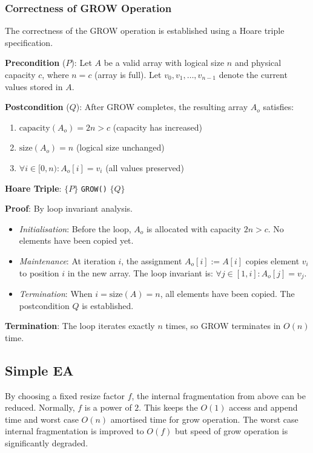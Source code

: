 \subsubsection{Correctness of GROW Operation}

The correctness of the GROW operation is established using a Hoare triple specification.

\textbf{Precondition} ($P$): Let $A$ be a valid array with logical size $n$ and physical capacity $c$, where $n = c$ (array is full). Let $v_0, v_1, \ldots, v_{n-1}$ denote the current values stored in $A$.

\textbf{Postcondition} ($Q$): After GROW completes, the resulting array $A_o$ satisfies:
\begin{enumerate}
    \item $\text{capacity}(A_o) = 2n > c$ (capacity has increased)
    \item $\text{size}(A_o) = n$ (logical size unchanged)
    \item $\forall i \in [0, n): A_o[i] = v_i$ (all values preserved)
\end{enumerate}

\textbf{Hoare Triple}: $\{P\}$ \texttt{GROW()} $\{Q\}$

\textbf{Proof}: By loop invariant analysis.
\begin{itemize}
    \item \textit{Initialisation}: Before the loop, $A_o$ is allocated with capacity $2n > c$. No elements have been copied yet.
    \item \textit{Maintenance}: At iteration $i$, the assignment $A_o[i] := A[i]$ copies element $v_i$ to position $i$ in the new array. The loop invariant is: $\forall j \in [1, i]: A_o[j] = v_j$.
    \item \textit{Termination}: When $i = \text{size}(A) = n$, all elements have been copied. The postcondition $Q$ is established.
\end{itemize}

\textbf{Termination}: The loop iterates exactly $n$ times, so GROW terminates in $O(n)$ time.

\subsection{Simple EA}
By choosing a fixed resize factor $f$, the internal fragmentation from above can be reduced. Normally, $f$ is a power of $2$. This keeps the $O(1)$ access and append time and worst case $O(n)$ amortised time for grow operation. The worst case internal fragmentation is improved to $O(f)$ but speed of grow operation is significantly degraded.

